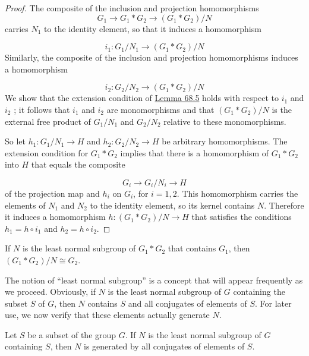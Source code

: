 \begin{proof}
The composite of the inclusion and projection homomorphisms
\[
G_{1} \rightarrow {G}_{1} * G_{2} \rightarrow ( {G_{1} * G_{2}}) /N
\]
carries \(N_{1}\) to the identity element, so that it induces a homomorphism

\[
i_{1} : G_{1}/N_{1} \rightarrow ( {G_{1} * G_{2}}) /N
\]
Similarly, the composite of the inclusion and projection homomorphisms induces a homomorphism

\[
i_{2} : G_{2}/N_{2} \rightarrow ( {G_{1} * G_{2}}) /N
\]
We show that the extension condition of \hyperref[lem:68.5]{Lemma 68.5} holds with respect to \(i_{1}\) and \(i_{2}\) ; it follows that \(i_{1}\) and \(i_{2}\) are monomorphisms and that \(( {G_{1} * G_{2}}) /N\) is the external free product of \(G_{1}/N_{1}\) and \(G_{2}/N_{2}\) relative to these monomorphisms.

So let \(h_{1} : G_{1}/N_{1} \rightarrow H\) and \(h_{2} : G_{2}/N_{2} \rightarrow H\) be arbitrary homomorphisms. The extension condition for \(G_{1} * G_{2}\) implies that there is a homomorphism of \(G_{1} * G_{2}\) into \(H\) that equals the composite

\[
G_{i} \rightarrow {G}_{i}/N_{i} \rightarrow H
\]
of the projection map and \(h_{i}\) on \(G_{i}\), for \(i = 1,2\). This homomorphism carries the elements of \(N_{1}\) and \(N_{2}\) to the identity element, so its kernel contains \(N\). Therefore it induces a homomorphism \(h : ( {G_{1} * G_{2}}) /N \rightarrow H\) that satisfies the conditions \(h_{1} = h \circ {i}_{1}\) and \(h_{2} = h \circ {i}_{2}\).
\end{proof}
\begin{corollary}
\label{cor:\thetheorem}
If \(N\) is the least normal subgroup of \(G_{1} * G_{2}\) that contains \(G_{1}\), then \(( {G_{1} * G_{2}}) /N \cong {G}_{2}\).
\end{corollary}

The notion of ``least normal subgroup'' is a concept that will appear frequently as we proceed. Obviously, if \(N\) is the least normal subgroup of \(G\) containing the subset \(S\) of \(G\), then \(N\) contains \(S\) and all conjugates of elements of \(S\). For later use, we now verify that these elements actually generate \(N\).

\begin{lemma}
\label{lem:\thetheorem}
Let \(S\) be a subset of the group \(G\). If \(N\) is the least normal subgroup of \(G\) containing \(S\), then \(N\) is generated by all conjugates of elements of \(S\).
\end{lemma}

